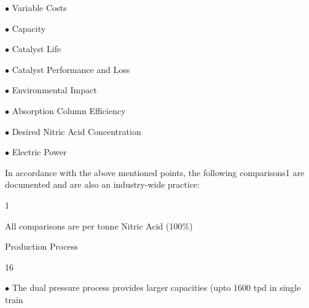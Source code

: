 \documentclass[a4paper,portrait,12pt]{article}
\begin{document}
\begin{flushleft}
$\bullet$ Variable Costs
\end{flushleft}


\begin{flushleft}
$\bullet$ Capacity
\end{flushleft}


\begin{flushleft}
$\bullet$ Catalyst Life
\end{flushleft}


\begin{flushleft}
$\bullet$ Catalyst Performance and Loss
\end{flushleft}


\begin{flushleft}
$\bullet$ Environmental Impact
\end{flushleft}


\begin{flushleft}
$\bullet$ Absorption Column Efficiency
\end{flushleft}


\begin{flushleft}
$\bullet$ Desired Nitric Acid Concentration
\end{flushleft}


\begin{flushleft}
$\bullet$ Electric Power
\end{flushleft}


\begin{flushleft}
In accordance with the above mentioned points, the following comparisons1 are documented and are also an industry-wide practice:
\end{flushleft}


1





\begin{flushleft}
All comparisons are per tonne Nitric Acid (100\%)
\end{flushleft}





\begin{flushleft}
\newpage
Production Process
\end{flushleft}





16





\begin{flushleft}
$\bullet$ The dual pressure process provides larger capacities (upto 1600 tpd in single train
\end{flushleft}
\end{document}
